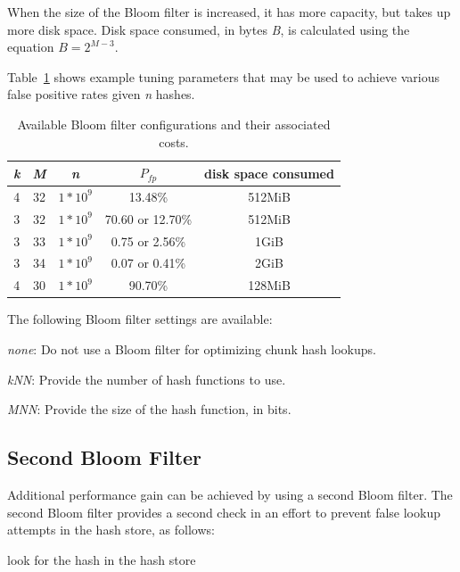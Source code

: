 \documentclass[12pt,twoside]{article}
\begin{document}
When the size of the Bloom filter is increased, it has more capacity,
but takes up more disk space.
Disk space consumed, in bytes \emph{B}, is calculated
using the equation \begin{math}B=2^{M-3}\end{math}.

Table~\ref{bloom-parameters} shows example tuning parameters
that may be used to achieve various false positive rates given \emph{n} hashes.

\begin{table}[h]
\center
\begin{tabular}{|c|c|c|c|c|}
\hline
\emph{k} & \emph{M} & \emph{n} & \begin{math}P_{fp}\end{math} & disk space consumed \\
\hline
4 & 32 & \begin{math}1*10^{9}\end{math} & 13.48\% & 512MiB \\
3 & 32 & \begin{math}1*10^{9}\end{math} & 70.60 or 12.70\% & 512MiB \\
3 & 33 & \begin{math}1*10^{9}\end{math} & 0.75 or 2.56\% & 1GiB \\
3 & 34 & \begin{math}1*10^{9}\end{math} & 0.07 or 0.41\% & 2GiB \\
4 & 30 & \begin{math}1*10^{9}\end{math} & 90.70\% & 128MiB \\
\hline
\end{tabular}
\caption{Available Bloom filter configurations and their associated costs.\label{bloom-parameters}}
\end{table}

The following Bloom filter settings are available:
\begin{compactitem}
\item \emph{none}: Do not use a Bloom filter for optimizing chunk hash lookups.
\item \emph{kNN}: Provide the number of hash functions to use.
\item \emph{MNN}: Provide the size of the hash function, in bits.
\end{compactitem}

\subsection{Second Bloom Filter}
Additional performance gain can be achieved by using a second Bloom filter.
The second Bloom filter provides a second check
in an effort to prevent false lookup attempts in the hash store, as follows:
\begin{algorithmic}
    \STATE look for the hash in the hash store
  \ENDIF
\ENDIF
\end{algorithmic}
\end{document}
